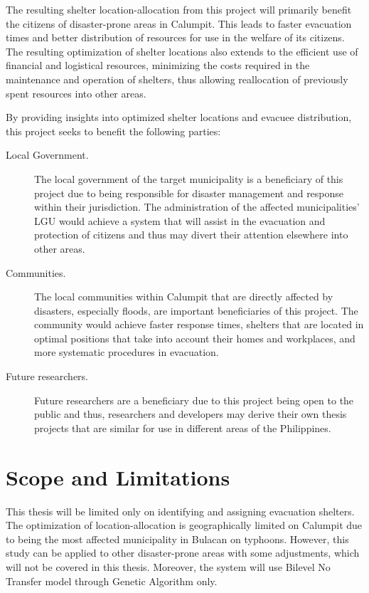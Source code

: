 	The resulting shelter location-allocation from this project will primarily benefit the citizens of disaster-prone areas in Calumpit. This leads to faster evacuation times and better distribution of resources for use in the welfare of its citizens. The resulting optimization of shelter locations also extends to the efficient use of financial and logistical resources, minimizing the costs required in the maintenance and operation of shelters, thus allowing reallocation of previously spent resources into other areas.
	
	By providing insights into optimized shelter locations and evacuee distribution, this project seeks to benefit the following parties:
	
	\begin{description}
		\item[Local Government.] The local government of the target municipality is a beneficiary of this project due to being responsible for disaster management and response within their jurisdiction. The administration of the affected municipalities’ LGU would achieve a system that will assist in the evacuation and protection of citizens and thus may divert their attention elsewhere into other areas.
		
		\item[Communities.] The local communities within Calumpit that are directly affected by disasters, especially floods, are important beneficiaries of this project. The community would achieve faster response times, shelters that are located in optimal positions that take into account their homes and workplaces, and more systematic procedures in evacuation.
		
		\item[Future researchers.] Future researchers are a beneficiary due to this project being open to the public and thus, researchers and developers may derive their own thesis projects that are similar for use in different areas of the Philippines.
		
	\end{description}

\section{Scope and Limitations}
	This thesis will be limited only on identifying and assigning evacuation shelters. The optimization of location-allocation is geographically limited on Calumpit due to being the most affected municipality in Bulacan on typhoons. However, this study can be applied to other disaster-prone areas with some adjustments, which will not be covered in this thesis. Moreover, the system will use Bilevel No Transfer model through Genetic Algorithm only.
	
